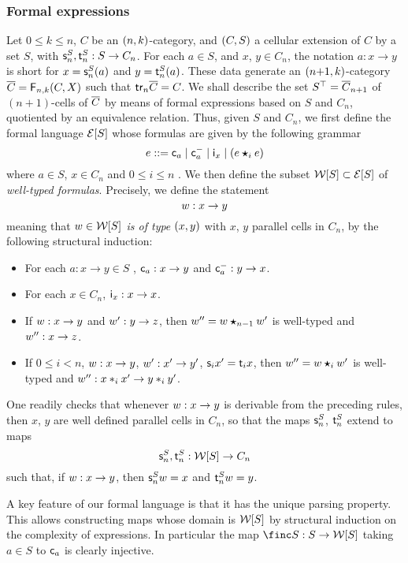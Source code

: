 \subsubsection{Formal expressions}\label{ssubsec:formex}
Let $0\leq k\leq n$, $C$ be an $(n,k)$-category, and  $(C,S)$ a
cellular extension of $C$ by a set $S$, with $\mathsf{s}_{n}^S,\mathsf{t}_{n}^S:S\to C_n$. For each $a\in S$, and $x$,
$y\in C_n$, the notation $a:x\to y$ is short for 
$x=\mathsf{s}_{n}^S(a)$ and $y=\mathsf{t}_{n}^S(a)$. 
These data generate an $(n{+}1,k)$-category $\overline{C}=\mathsf{F}_{n,k}(C,X)$ such that $\mathsf{tr}_{n} \overline{C}=C$. We shall describe the set $S^\top=\overline{C}_{n+1}$ of
$(n{+}1)$-cells of $\overline{C}$ by means of formal expressions
based on $S$ and $C_n$, quotiented by an equivalence relation. Thus,
given $S$ and $C_n$, we first define the formal language $\mathcal{E}[S]$
whose formulas are given by the following grammar
\[
  e ::= \mathsf{c}_{a} \mid \mathsf{c}^{-}_{a} \mid \mathsf{i}_{x} \mid (e\bm{\star}_{i} e)
\]
where $a\in S$, $x\in C_n$ and $0\leq i\leq n$ . We then define the
subset  $\mathcal{W}[S]\subset\mathcal{E}[S]$ of {\em well-typed formulas}.
Precisely, we define the statement
\[w:x\to y\]
meaning that {\em $w\in\mathcal{W}[S]$ is of type $(x,y)$} with $x$, $y$ parallel
cells in $C_n$, by the following structural induction:
\begin{itemize}
\item For each $a:x\to y\in S$ ,
  $\mathsf{c}_{a}:x\to y$
  and $\mathsf{c}^{-}_{a}:y\to x$.
\item For  each $x\in C_n$, $\mathsf{i}_{x}:x\to x$.
 \item If $w:x\to y$ and $w':y\to z$, then $w''=w\bm{\star}_{n-1}w'$ is
   well-typed and $w'':x\to z$.
 \item If $0\leq i<n$, $w:x\to y$, $w':x'\to y'$, $\mathsf{s}_{i}{x'}=\mathsf{t}_{i}{x}$, then $w''=w\bm{\star}_{i} w'$ is well-typed and
   $w'':x\ast_{i} x'\to y\ast_{i} y'$. 
 \end{itemize}
 One readily checks that whenever $w:x\to y$ is derivable from the
 preceding rules, then $x$, $y$ are well defined parallel cells in
 $C_n$, so that the maps $\mathsf{s}_{n}^S$, $\mathsf{t}_{n}^S$ extend to maps
 \[\mathsf{s}_{n}^S, \mathsf{t}_{n}^S :\mathcal{W}[S]\to C_n\]
 such that, if $w:x\to y$,  then $\mathsf{s}_{n}^S w=x$ and $\mathsf{t}_{n}^S w=y$.
 \begin{remark}\label{rk:parsing}
   A key feature of our formal language is that it has the unique
   parsing property. This allows constructing maps whose domain is $\mathcal{W}[S]$
   by structural induction on the complexity of expressions. In
   particular the map $\finc S:S\to\wtx S$ taking $a\in S$ to $\mathsf{c}_{a}$ is clearly injective.
 \end{remark}
